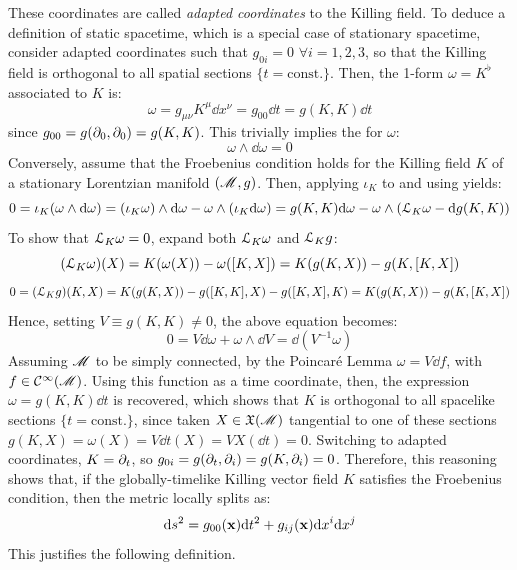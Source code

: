 These coordinates are called \emph{adapted coordinates} to the Killing field. To deduce a definition of static spacetime, which is a special case of stationary spacetime, consider adapted coordinates such that $ g_{0i} = 0 \,\, \forall i = 1,2,3 $, so that the Killing field is orthogonal to all spatial sections $ \{t = \text{const.}\} $. Then, the 1-form $ \omega = K^\flat $ associated to $ K $ is:
\begin{equation*}
  \omega = g_{\mu \nu} K^\mu \dd x^\nu = g_{00} \dd t = g(K,K) \dd t
\end{equation*}
since $ g_{00} = g(\partial_0 , \partial_0) = g(K , K) $. This trivially implies the  for $ \omega $:
\begin{equation}
  \omega \wedge \dd \omega = 0
  \label{eq:froebenius-cond}
\end{equation}
Conversely, assume that the Froebenius condition holds for the Killing field $ K $ of a stationary Lorentzian manifold $ (\mathscr{M} , g) $. Then, applying $ \iota_K $ to  and using  yields:
\begin{equation*}
  0 = \iota_K (\omega \wedge \mathrm{d} \omega) = (\iota_K \omega) \wedge \mathrm{d} \omega - \omega \wedge (\iota_K \mathrm{d} \omega) = g(K,K) \mathrm{d} \omega - \omega \wedge (\EuScript{L}_K \omega - \mathrm{d} g(K , K))
\end{equation*}
To show that $ \EuScript{L}_K \omega = 0 $, expand both $ \EuScript{L}_K \omega $ and $ \EuScript{L}_K g $:
\begin{equation*}
  (\EuScript{L}_K \omega)(X) = K(\omega(X)) - \omega([K,X]) = K(g(K,X)) - g(K , [K,X])
\end{equation*}
\begin{equation*}
  0 = (\EuScript{L}_K g)(K,X) = K(g(K,X)) - g([K,K] , X) - g([K,X],K) = K(g(K,X)) - g(K , [K,X])
\end{equation*}
Hence, setting $ V \equiv g(K,K) \neq 0 $, the above equation becomes:
\begin{equation*}
  0 = V \dd \omega + \omega \wedge \dd V = \dd (V^{-1} \omega)
\end{equation*}
Assuming $ \mathscr{M} $ to be simply connected, by the Poincaré Lemma $ \omega = V \dd f $, with $ f \in \mathcal{C}^{\infty}(\mathscr{M}) $. Using this function as a time coordinate, then, the expression $ \omega = g(K , K) \dd t $ is recovered, which shows that $ K $ is orthogonal to all spacelike sections $ \{t = \text{const.}\} $, since taken $ X \in \mathfrak{X}(\mathscr{M}) $ tangential to one of these sections $ g(K,X) = \omega(X) = V \dd t(X) = V X(\dd t) = 0 $. Switching to adapted coordinates, $ K = \partial_t $, so $ g_{0i} = g(\partial_t , \partial_i) = g(K , \partial_i) = 0 $. Therefore, this reasoning shows that, if the globally-timelike Killing vector field $ K $ satisfies the Froebenius condition, then the metric locally splits as:
\begin{equation}
  \mathrm{d} s^2 = g_{00}(\mathbf{x}) \mathrm{d} t^2 + g_{ij}(\mathbf{x}) \mathrm{d} x^i \mathrm{d} x^j
\end{equation}
This justifies the following definition.

